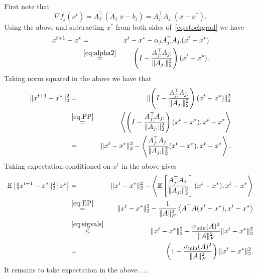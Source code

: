 \documentclass[11pt]{article}
\newcommand{\E}[1]{\mathbb{E}\left[#1\right] }
\newcommand{\norm}[1]{\lVert#1\rVert}
\newcommand{\dotprod}[1]{\left< #1\right>}
\begin{document}
\begin{ExerciseList}
    \Answer[ref={II}]  First note that
 \[\nabla f_j(x^t) = A_{j:}^\top (A_{j:} x -b_j) = A_{j:}^\top A_{j:}(x -x^*).\]
 Using the above and subtracting $x^*$ from both sides of~\eqref{eq:stochgrad} we have
 \begin{eqnarray*}
 x^{t+1} - x^* &=& x^t-x^* - \alpha_j A_{j:}^\top A_{j:}(x^t -x^*)\\
 &\overset{\eqref{eq:alpha2}}{ =} & \left(I-  \frac{A_{j:}^\top A_{j:}}{\norm{A_{j:}}_2^2} \right)(x^t -x^*).
 \end{eqnarray*}
Taking norm squared in the above we have that
  \begin{eqnarray*}
\norm{x^{t+1} - x^*}_2^2 & =&  \norm{\left(I-  \frac{A_{j:}^\top A_{j:}}{\norm{A_{j:}}_2^2} \right)(x^t -x^*)}_2^2\\
&\overset{\eqref{eq:PP}}{=}&  \dotprod{\left(I-  \frac{A_{j:}^\top A_{j:}}{\norm{A_{j:}}_2^2} \right)(x^t -x^*), x^t -x^*}\\
&= & \norm{x^t -x^*}_2^2 - \dotprod{\frac{A_{j:}^\top A_{j:}}{\norm{A_{j:}}_2^2} (x^t -x^*), x^t -x^*}.
 \end{eqnarray*}
 Taking expectation conditioned on $x^t$ in the above gives
   \begin{eqnarray*}
\E{\norm{x^{t+1} - x^*}_2^2\, | \, x^t} & =& \norm{x^t -x^*}_2^2 - \dotprod{\E{\frac{A_{j:}^\top A_{j:}}{\norm{A_{j:}}_2^2} }(x^t -x^*), x^t -x^*}\\
& \overset{\eqref{eq:EP}}{=} & \norm{x^t -x^*}_2^2 - \frac{1}{\norm{A}_F^2}\dotprod{A^\top A(x^t -x^*), x^t -x^*}\\
& \overset{\eqref{eq:sigvals}}{\leq} & \norm{x^t -x^*}_2^2 -  \frac{\sigma_{\min}(A)^2 }{\norm{A}_F^2}\norm{x^t -x^*}_2^2\\
& =& \left(1-  \frac{\sigma_{\min}(A)^2 }{\norm{A}_F^2}\right)\norm{x^t -x^*}_2^2 .
 \end{eqnarray*}
 It remains to take expectation in the above.
     \Answer[ref={III}] ...
\end{ExerciseList}

\printbibliography
\end{document}
